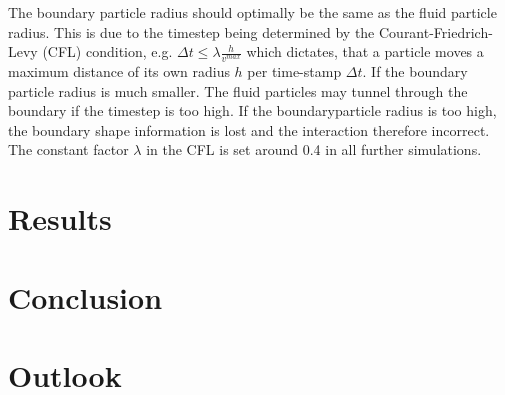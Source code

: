 \documentclass[11pt, letterpaper, twocolumn]{article}
\begin{document}
The boundary particle radius should optimally be the same as the fluid particle radius. This is due to the timestep being determined by the Courant-Friedrich-Levy (CFL) condition, e.g. \( \Delta t \leq \lambda \frac{h}{v^{max}}\) which dictates, that a particle moves a maximum distance of its own radius \(h\) per time-stamp \(\Delta t \). If the boundary particle radius is much smaller. The fluid particles may tunnel through the boundary if the timestep is too high. If the boundaryparticle radius is too high, the boundary shape information is lost and the interaction therefore incorrect. The constant factor \(\lambda\) in the CFL is set around 0.4 in all further simulations.





\section*{Results}
\label{sec:results}


\section*{Conclusion}
\label{sec:conclusion}



\section*{Outlook}
\label{sec:future}




{\footnotesize
}



\end{document}
